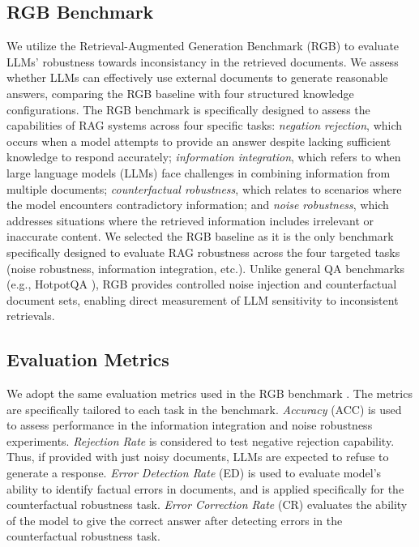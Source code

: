 \documentclass[letterpaper, 10 pt, conference]{ieeeconf}  %
\begin{document}
\subsection{RGB Benchmark}
We utilize the Retrieval-Augmented Generation Benchmark (RGB) \cite{chen2024benchmarking} to evaluate LLMs' robustness towards inconsistancy in the retrieved documents. We assess whether LLMs can effectively use external documents to generate reasonable answers, comparing the RGB baseline with four structured knowledge configurations. The RGB benchmark is specifically designed to assess the capabilities of RAG systems across four specific tasks:  \emph{negation rejection}, which occurs when a model attempts to provide an answer despite lacking sufficient knowledge to respond accurately;  \emph{information integration}, which refers to when large language models (LLMs) face challenges in combining information from multiple documents;  \emph{counterfactual robustness}, which relates to scenarios where the model encounters contradictory information; and  \emph{noise robustness}, which addresses situations where the retrieved information includes irrelevant or inaccurate content. We selected the RGB baseline as it is the only benchmark specifically designed to evaluate RAG robustness across the four targeted tasks (noise robustness, information integration, etc.). Unlike general QA benchmarks (e.g., HotpotQA \cite{yang2018hotpotqa}), RGB provides controlled noise injection and counterfactual document sets, enabling direct measurement of LLM sensitivity to inconsistent retrievals. %

\subsection{Evaluation Metrics}
We adopt the same evaluation metrics used in the RGB benchmark \cite{chen2024benchmarking}. The metrics are specifically tailored to each task in the benchmark. \emph{Accuracy} (ACC) is used to assess performance in the information integration and noise robustness experiments. \emph{Rejection Rate} is considered to test negative rejection capability. Thus, if provided with just noisy documents, LLMs are expected to refuse to generate a response. \emph{Error Detection Rate} (ED) is used to evaluate model's ability to identify factual errors in documents, and is applied specifically for the counterfactual robustness task. \emph{Error Correction Rate} (CR) evaluates the ability of the model to give the correct answer after detecting errors in the counterfactual robustness task. 
\end{document}

